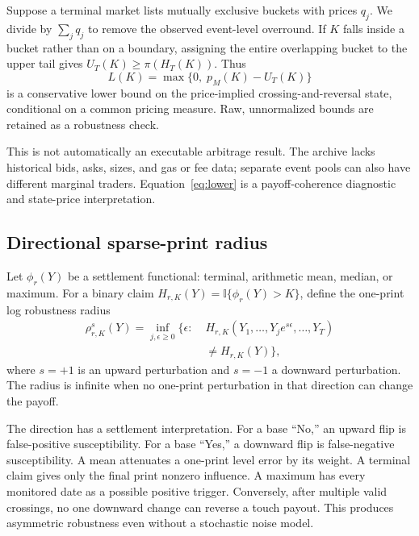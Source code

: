 \documentclass[10pt,twocolumn]{article}
\newcommand{\I}{\mathbb{I}}
\begin{document}
Suppose a terminal market lists mutually exclusive buckets with prices $q_j$.
We divide by $\sum_jq_j$ to remove the observed event-level overround. If $K$
falls inside a bucket rather than on a boundary, assigning the entire
overlapping bucket to the upper tail gives $U_T(K)\ge\pi(H_T(K))$. Thus
\begin{equation}
L(K)=\max\{0,\;p_M(K)-U_T(K)\}
\label{eq:lower}
\end{equation}
is a conservative lower bound on the price-implied crossing-and-reversal state,
conditional on a common pricing measure. Raw, unnormalized bounds are retained
as a robustness check.

This is not automatically an executable arbitrage result. The archive lacks
historical bids, asks, sizes, and gas or fee data; separate event pools can also
have different marginal traders. Equation~\eqref{eq:lower} is a payoff-coherence
diagnostic and state-price interpretation.

\subsection{Directional sparse-print radius}

Let $\phi_r(Y)$ be a settlement functional: terminal, arithmetic mean, median,
or maximum. For a binary claim $H_{r,K}(Y)=\I\{\phi_r(Y)>K\}$, define the
one-print log robustness radius
\begin{equation}
\begin{aligned}
\rho_{r,K}^{s}(Y)=\inf_{j,\epsilon\ge0}\bigl\{\epsilon:\;&
H_{r,K}(Y_1,\ldots,Y_je^{s\epsilon},\ldots,Y_T)\\[-2pt]
&\ne H_{r,K}(Y)\bigr\},
\end{aligned}
\label{eq:radius}
\end{equation}
where $s=+1$ is an upward perturbation and $s=-1$ a downward perturbation.
The radius is infinite when no one-print perturbation in that direction can
change the payoff.

The direction has a settlement interpretation. For a base ``No,'' an upward
flip is false-positive susceptibility. For a base ``Yes,'' a downward flip is
false-negative susceptibility. A mean attenuates a one-print level error by its
weight. A terminal claim gives only the final print nonzero influence. A maximum
has every monitored date as a possible positive trigger. Conversely, after
multiple valid crossings, no one downward change can reverse a touch payout.
This produces asymmetric robustness even without a stochastic noise model.
\end{document}
